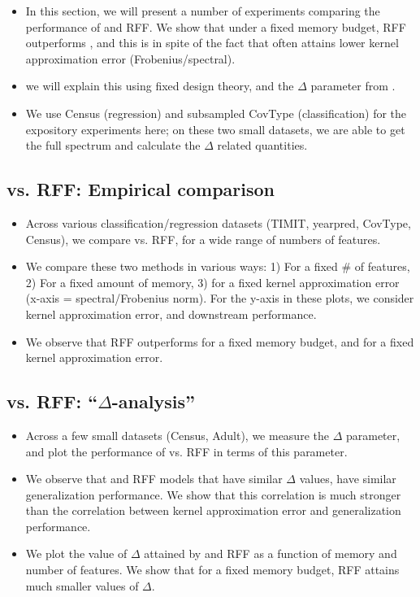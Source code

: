 \begin{itemize}
	\item In this section, we will present a number of experiments comparing the performance of \Nystrom and RFF.  We show that under a fixed memory budget, RFF outperforms \NystromNS, and this is in spite of the fact that \Nystrom often attains lower kernel approximation error (Frobenius/spectral).
	\item we will explain this using fixed design theory, and the $\Delta$ parameter from \citep{avron17}. 
	\item We use Census (regression) and subsampled CovType (classification) for the expository experiments here; on these two small datasets, we are able to get the full spectrum and calculate the $\Delta$ related quantities.
\end{itemize}

\subsection{\Nystrom vs. RFF: Empirical comparison}
\begin{itemize}
	\item Across various classification/regression datasets (TIMIT, yearpred, CovType, Census), we compare \Nystrom vs. RFF, for a wide range of numbers of features.
	\item We compare these two methods in various ways: 1) For a fixed \# of features, 2) For a fixed amount of memory, 3) for a fixed kernel approximation error (x-axis = spectral/Frobenius norm).  For the y-axis in these plots, we consider kernel approximation error, and downstream performance.
	\item We observe that RFF outperforms \Nystrom for a fixed memory budget, and for a fixed kernel approximation error.
\end{itemize}

\subsection{\Nystrom vs. RFF: ``$\Delta$-analysis''}
\begin{itemize}
	\item Across a few small datasets (Census, Adult), we measure the $\Delta$ parameter, and plot the performance of \Nystrom vs. RFF in terms of this parameter.
	\item We observe that \Nystrom and RFF models that have similar $\Delta$ values, have similar generalization performance.  We show that this correlation is much stronger than the correlation between kernel approximation error and generalization performance.
	\item We plot the value of $\Delta$ attained by \Nystrom and RFF as a function of memory and number of features.  We show that for a fixed memory budget, RFF attains much smaller values of $\Delta$.
\end{itemize}